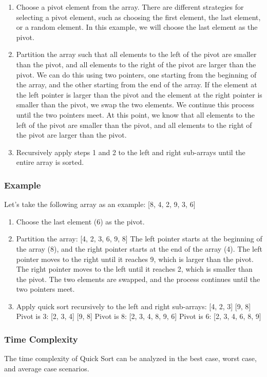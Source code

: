 \documentclass[a4paper, 11pt, oneside]{book} %
\begin{document}
\begin{enumerate}
  \item Choose a pivot element from the array. There are different strategies for selecting a pivot element, such as choosing the first element, the last element, or a random element. In this example, we will choose the last element as the pivot.
  \item Partition the array such that all elements to the left of the pivot are smaller than the pivot, and all elements to the right of the pivot are larger than the pivot. We can do this using two pointers, one starting from the beginning of the array, and the other starting from the end of the array. If the element at the left pointer is larger than the pivot and the element at the right pointer is smaller than the pivot, we swap the two elements. We continue this process until the two pointers meet. At this point, we know that all elements to the left of the pivot are smaller than the pivot, and all elements to the right of the pivot are larger than the pivot.
  \item Recursively apply steps 1 and 2 to the left and right sub-arrays until the entire array is sorted.
\end{enumerate}

\subsubsection{Example}
Let's take the following array as an example: [8, 4, 2, 9, 3, 6]
\begin{enumerate}
  \item Choose the last element (6) as the pivot.
  \item Partition the array:
[4, 2, 3, 6, 9, 8]
The left pointer starts at the beginning of the array (8), and the right pointer starts at the end of the array (4). The left pointer moves to the right until it reaches 9, which is larger than the pivot. The right pointer moves to the left until it reaches 2, which is smaller than the pivot. The two elements are swapped, and the process continues until the two pointers meet.
  \item Apply quick sort recursively to the left and right sub-arrays:
[4, 2, 3] [9, 8]
Pivot is 3:
[2, 3, 4] [9, 8]
Pivot is 8:
[2, 3, 4, 8, 9, 6]
Pivot is 6:
[2, 3, 4, 6, 8, 9]
\end{enumerate}

\subsubsection{Time Complexity}
The time complexity of Quick Sort can be analyzed in the best case, worst case, and average case scenarios.
\end{document}
